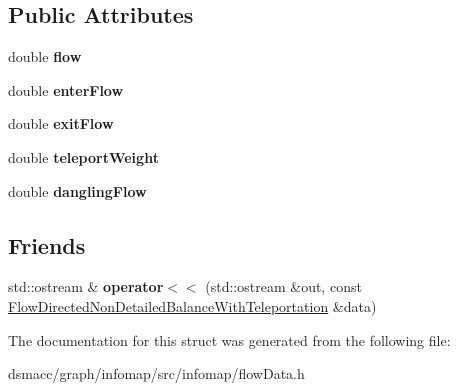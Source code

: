 \subsection*{Public Attributes}
\begin{DoxyCompactItemize}
\item 
\mbox{\label{structFlowDirectedNonDetailedBalanceWithTeleportation_a805b1c31faeeddc30aaa2ce1083cb71f}} 
double {\bfseries flow}
\item 
\mbox{\label{structFlowDirectedNonDetailedBalanceWithTeleportation_a6184fea56aa905a6b6763a113b3d3184}} 
double {\bfseries enter\+Flow}
\item 
\mbox{\label{structFlowDirectedNonDetailedBalanceWithTeleportation_a87c508f44be2c1ea5673557caea9cc83}} 
double {\bfseries exit\+Flow}
\item 
\mbox{\label{structFlowDirectedNonDetailedBalanceWithTeleportation_a726e83ebabfe16eded92464823e59da5}} 
double {\bfseries teleport\+Weight}
\item 
\mbox{\label{structFlowDirectedNonDetailedBalanceWithTeleportation_ae5d31e2d9e8f1a49f71190b7ca3df293}} 
double {\bfseries dangling\+Flow}
\end{DoxyCompactItemize}
\subsection*{Friends}
\begin{DoxyCompactItemize}
\item 
\mbox{\label{structFlowDirectedNonDetailedBalanceWithTeleportation_a10977e3a9202a8ef2594aa42f51aa7dd}} 
std\+::ostream \& {\bfseries operator$<$$<$} (std\+::ostream \&out, const \mbox{\hyperlink{structFlowDirectedNonDetailedBalanceWithTeleportation}{Flow\+Directed\+Non\+Detailed\+Balance\+With\+Teleportation}} \&data)
\end{DoxyCompactItemize}


The documentation for this struct was generated from the following file\+:\begin{DoxyCompactItemize}
\item 
dsmacc/graph/infomap/src/infomap/flow\+Data.\+h\end{DoxyCompactItemize}

